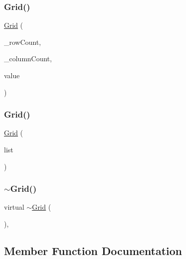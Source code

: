 \mbox{\label{classGrid_a172bec01c9ecb4e2b43899fa317396a6}} 
\subsubsection{\texorpdfstring{Grid()}{Grid()}\hspace{0.1cm}{\footnotesize\ttfamily [3/4]}}
{\footnotesize\ttfamily \mbox{\hyperlink{classGrid}{Grid}} (\begin{DoxyParamCaption}\item[{int}]{\+\_\+row\+Count,  }\item[{int}]{\+\_\+column\+Count,  }\item[{const Value\+Type \&}]{value }\end{DoxyParamCaption})}

\mbox{\label{classGrid_a7700c2d2dc68587062f6696625802cd8}} 
\subsubsection{\texorpdfstring{Grid()}{Grid()}\hspace{0.1cm}{\footnotesize\ttfamily [4/4]}}
{\footnotesize\ttfamily \mbox{\hyperlink{classGrid}{Grid}} (\begin{DoxyParamCaption}\item[{std\+::initializer\+\_\+list$<$ std\+::initializer\+\_\+list$<$ Value\+Type $>$$>$}]{list }\end{DoxyParamCaption})}

\mbox{\label{classGrid_a422a4b493ffd647fcf87ff31619127ba}} 
\subsubsection{\texorpdfstring{$\sim$\+Grid()}{~Grid()}}
{\footnotesize\ttfamily virtual $\sim$\mbox{\hyperlink{classGrid}{Grid}} (\begin{DoxyParamCaption}{ }\end{DoxyParamCaption})\hspace{0.3cm}{\ttfamily [virtual]}, {\ttfamily [default]}}



\subsection{Member Function Documentation}
\mbox{\label{classGrid_ad69bd11391be1a1dba5c8202259664f8}} 
